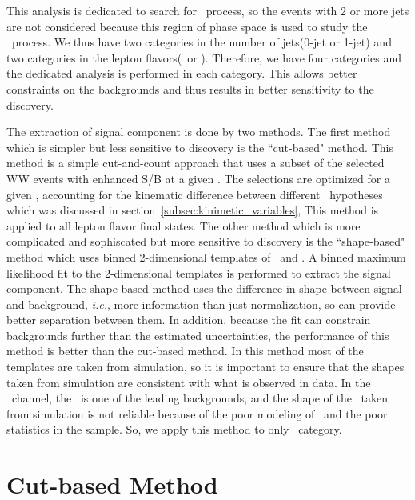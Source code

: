 This analysis is dedicated to search for \ggH\ process, 
so the events with 2 or more jets are not considered 
because this region of phase space is used to study the \qqH\ process. 
We thus have two categories in the number of jets(0-jet or 1-jet) 
and two categories in the lepton flavors(\DF\ or \SF). 
Therefore, we have four categories and the dedicated analysis 
is performed in each category. This allows better constraints on the 
backgrounds and thus results in better sensitivity to the discovery.  

The extraction of signal component is done by two methods. 
The first method which is simpler but less sensitive to discovery 
is the ``cut-based" method. This method is a simple cut-and-count approach 
that uses a subset of the selected WW events with enhanced S/B at a given \mHi.
The selections are optimized for a given \mHi,
accounting for the kinematic difference between different \mHi\ hypotheses 
which was discussed in section~\ref{subsec:kinimetic_variables}, 
This method is applied to all lepton flavor final states. 
The other method which is more complicated and sophiscated but more sensitive to discovery 
is the ``shape-based" method which uses binned 2-dimensional templates of \mT\ and \mll. 
A binned maximum likelihood fit to the 2-dimensional templates is performed to extract 
the signal component. The shape-based method uses the difference in shape 
between signal and background, \textit{i.e.}, more information than just normalization, 
so can provide better separation between them. 
In addition, because the fit can constrain backgrounds further than the estimated 
uncertainties, the performance of this method is better than the cut-based method. 
In this method most of the templates are taken from simulation,
so it is important to ensure that the shapes taken from simulation 
are consistent with what is observed in data. 
In the \SF\ channel, the \dyll\ is one of the leading backgrounds, and
the shape of the \dyll\ taken from simulation is not reliable because of the
poor modeling of \met\ and the poor statistics in the sample. So, we apply 
this method to only \DF\ category. 


\section{Cut-based Method}


